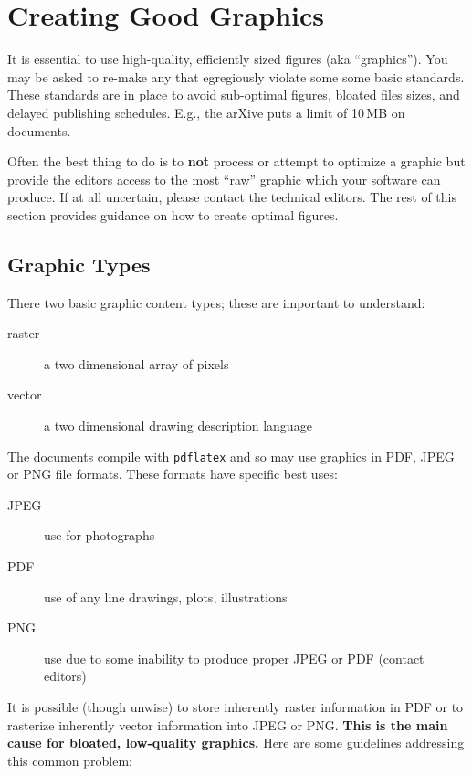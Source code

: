 \chapter{Creating Good Graphics}
\label{ch:graphics}


It is essential to use high-quality, efficiently sized figures (aka
``graphics'').
You may be asked to re-make any that egregiously violate some some
basic standards.
These standards are in place to avoid sub-optimal figures, bloated
files sizes, and delayed publishing schedules.  E.g., the arXive puts a limit of 10\,MB on documents.

Often the best thing to do is to \textbf{not} process or attempt to
optimize a graphic but provide the editors access to the most ``raw''
graphic which your software can produce.
If at all uncertain, please contact the technical editors.
The rest of this section provides guidance on how to create optimal
figures.

\section{Graphic Types}
\label{sec:graphic-types}

There two basic graphic content types; these are important to understand:

\begin{description}
\item[raster] a two dimensional array of pixels
\item[vector] a two dimensional drawing description language
\end{description}

The documents compile with \texttt{pdflatex} and so may use graphics
in PDF, JPEG or PNG file formats.
These formats have specific best uses:

\begin{description}
\item[JPEG] use for photographs
\item[PDF] use of any line drawings, plots, illustrations
\item[PNG] use due to some inability to produce proper JPEG or PDF (contact editors)
\end{description}

It is possible (though unwise) to store inherently raster information
in PDF or to rasterize inherently vector information into JPEG or PNG.
\textbf{This is the main cause for bloated, low-quality graphics.}
Here are some guidelines addressing this common problem:

